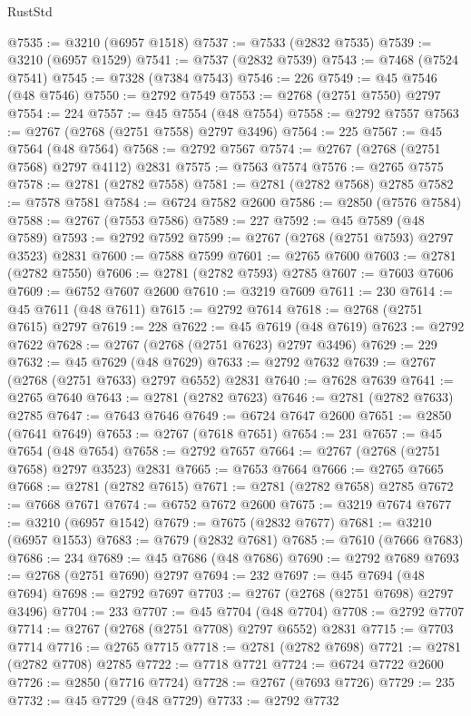 \begin{lexlean}{RustStd}
\begin{coremodule}
@7535 := @3210 (@6957 @1518)
@7537 := @7533 (@2832 @7535)
@7539 := @3210 (@6957 @1529)
@7541 := @7537 (@2832 @7539)
@7543 := @7468 (@7524 @7541)
@7545 := @7328 (@7384 @7543)
@7546 := 226
@7549 := @45 @7546 (@48 @7546)
@7550 := @2792 @7549
@7553 := @2768 (@2751 @7550) @2797
@7554 := 224
@7557 := @45 @7554 (@48 @7554)
@7558 := @2792 @7557
@7563 := @2767 (@2768 (@2751 @7558) @2797 @3496)
@7564 := 225
@7567 := @45 @7564 (@48 @7564)
@7568 := @2792 @7567
@7574 := @2767 (@2768 (@2751 @7568) @2797 @4112) @2831
@7575 := @7563 @7574
@7576 := @2765 @7575
@7578 := @2781 (@2782 @7558)
@7581 := @2781 (@2782 @7568) @2785
@7582 := @7578 @7581
@7584 := @6724 @7582 @2600
@7586 := @2850 (@7576 @7584)
@7588 := @2767 (@7553 @7586)
@7589 := 227
@7592 := @45 @7589 (@48 @7589)
@7593 := @2792 @7592
@7599 := @2767 (@2768 (@2751 @7593) @2797 @3523) @2831
@7600 := @7588 @7599
@7601 := @2765 @7600
@7603 := @2781 (@2782 @7550)
@7606 := @2781 (@2782 @7593) @2785
@7607 := @7603 @7606
@7609 := @6752 @7607 @2600
@7610 := @3219 @7609
@7611 := 230
@7614 := @45 @7611 (@48 @7611)
@7615 := @2792 @7614
@7618 := @2768 (@2751 @7615) @2797
@7619 := 228
@7622 := @45 @7619 (@48 @7619)
@7623 := @2792 @7622
@7628 := @2767 (@2768 (@2751 @7623) @2797 @3496)
@7629 := 229
@7632 := @45 @7629 (@48 @7629)
@7633 := @2792 @7632
@7639 := @2767 (@2768 (@2751 @7633) @2797 @6552) @2831
@7640 := @7628 @7639
@7641 := @2765 @7640
@7643 := @2781 (@2782 @7623)
@7646 := @2781 (@2782 @7633) @2785
@7647 := @7643 @7646
@7649 := @6724 @7647 @2600
@7651 := @2850 (@7641 @7649)
@7653 := @2767 (@7618 @7651)
@7654 := 231
@7657 := @45 @7654 (@48 @7654)
@7658 := @2792 @7657
@7664 := @2767 (@2768 (@2751 @7658) @2797 @3523) @2831
@7665 := @7653 @7664
@7666 := @2765 @7665
@7668 := @2781 (@2782 @7615)
@7671 := @2781 (@2782 @7658) @2785
@7672 := @7668 @7671
@7674 := @6752 @7672 @2600
@7675 := @3219 @7674
@7677 := @3210 (@6957 @1542)
@7679 := @7675 (@2832 @7677)
@7681 := @3210 (@6957 @1553)
@7683 := @7679 (@2832 @7681)
@7685 := @7610 (@7666 @7683)
@7686 := 234
@7689 := @45 @7686 (@48 @7686)
@7690 := @2792 @7689
@7693 := @2768 (@2751 @7690) @2797
@7694 := 232
@7697 := @45 @7694 (@48 @7694)
@7698 := @2792 @7697
@7703 := @2767 (@2768 (@2751 @7698) @2797 @3496)
@7704 := 233
@7707 := @45 @7704 (@48 @7704)
@7708 := @2792 @7707
@7714 := @2767 (@2768 (@2751 @7708) @2797 @6552) @2831
@7715 := @7703 @7714
@7716 := @2765 @7715
@7718 := @2781 (@2782 @7698)
@7721 := @2781 (@2782 @7708) @2785
@7722 := @7718 @7721
@7724 := @6724 @7722 @2600
@7726 := @2850 (@7716 @7724)
@7728 := @2767 (@7693 @7726)
@7729 := 235
@7732 := @45 @7729 (@48 @7729)
@7733 := @2792 @7732

\end{coremodule}
\end{lexlean}
